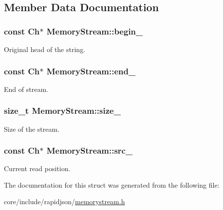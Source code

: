 \subsection{Member Data Documentation}
\subsubsection[{\texorpdfstring{begin\+\_\+}{begin_}}]{\setlength{\rightskip}{0pt plus 5cm}const {\bf Ch}$\ast$ Memory\+Stream\+::begin\+\_\+}\hypertarget{structMemoryStream_a91f0767b4f0ed2476d835e8344848a2f}{}\label{structMemoryStream_a91f0767b4f0ed2476d835e8344848a2f}


Original head of the string. 

\subsubsection[{\texorpdfstring{end\+\_\+}{end_}}]{\setlength{\rightskip}{0pt plus 5cm}const {\bf Ch}$\ast$ Memory\+Stream\+::end\+\_\+}\hypertarget{structMemoryStream_a55fb302ba0492419757e3ba318c8c654}{}\label{structMemoryStream_a55fb302ba0492419757e3ba318c8c654}


End of stream. 

\subsubsection[{\texorpdfstring{size\+\_\+}{size_}}]{\setlength{\rightskip}{0pt plus 5cm}size\+\_\+t Memory\+Stream\+::size\+\_\+}\hypertarget{structMemoryStream_ab26a1b5c6d5e8f52c0f6982feba47f36}{}\label{structMemoryStream_ab26a1b5c6d5e8f52c0f6982feba47f36}


Size of the stream. 

\subsubsection[{\texorpdfstring{src\+\_\+}{src_}}]{\setlength{\rightskip}{0pt plus 5cm}const {\bf Ch}$\ast$ Memory\+Stream\+::src\+\_\+}\hypertarget{structMemoryStream_a57cf6cb5766e931a62928b9f92507443}{}\label{structMemoryStream_a57cf6cb5766e931a62928b9f92507443}


Current read position. 



The documentation for this struct was generated from the following file\+:\begin{DoxyCompactItemize}
\item 
core/include/rapidjson/\hyperlink{memorystream_8h}{memorystream.\+h}\end{DoxyCompactItemize}
